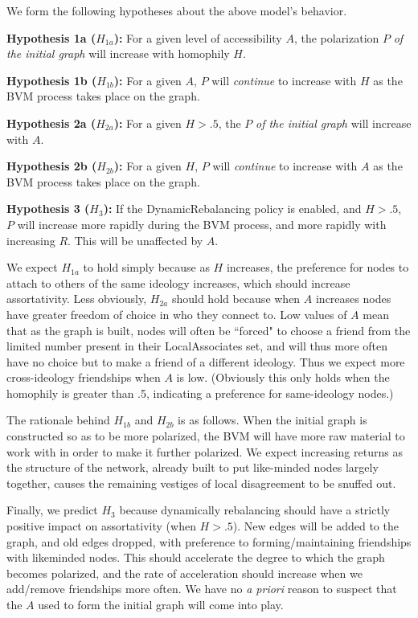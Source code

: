 
\label{sec:hypos}

We form the following hypotheses about the above model's behavior.

\begin{description}

\item{\textbf{Hypothesis 1a ($H_{1a}$):}} For a given level of accessibility
$A$, the polarization $P$ \textit{of the initial graph} will increase with
homophily $H$.

\item{\textbf{Hypothesis 1b ($H_{1b}$):}} For a given $A$, $P$ will
\textit{continue} to increase with $H$ as the BVM process takes place on the
graph.

\item{\textbf{Hypothesis 2a ($H_{2a}$):}} For a given $H>.5$, the $P$ \textit{of
the initial graph} will increase with $A$.

\item{\textbf{Hypothesis 2b ($H_{2b}$):}} For a given $H$, $P$ will
\textit{continue} to increase with $A$ as the BVM process takes place on the
graph.

\item{\textbf{Hypothesis 3 ($H_3$):}} If the DynamicRebalancing policy is
enabled, and $H>.5$, $P$ will increase more rapidly during the BVM process,
and more rapidly with increasing $R$. This will be unaffected by $A$.

\end{description}

We expect $H_{1a}$ to hold simply because as $H$ increases, the preference for
nodes to attach to others of the same ideology increases, which should
increase assortativity. Less obviously, $H_{2a}$ should hold because when $A$
increases nodes have greater freedom of choice in who they connect to. Low
values of $A$ mean that as the graph is built, nodes will often be ``forced"
to choose a friend from the limited number present in their LocalAssociates
set, and will thus more often have no choice but to make a friend of a
different ideology. Thus we expect more cross-ideology friendships when $A$ is
low. (Obviously this only holds when the homophily is greater than .5,
indicating a preference for same-ideology nodes.)

The rationale behind $H_{1b}$ and $H_{2b}$ is as follows. When the initial
graph is constructed so as to be more polarized, the BVM will have more raw
material to work with in order to make it further polarized. We expect
increasing returns as the structure of the network, already built to put
like-minded nodes largely together, causes the remaining vestiges of local
disagreement to be snuffed out.

Finally, we predict $H_3$ because dynamically rebalancing should have a
strictly positive impact on assortativity (when $H>.5$). New edges will be
added to the graph, and old edges dropped, with preference to
forming/maintaining friendships with likeminded nodes. This should accelerate
the degree to which the graph becomes polarized, and the rate of acceleration
should increase when we add/remove friendships more often. We have no
\textit{a priori} reason to suspect that the $A$ used to form the initial
graph will come into play.
